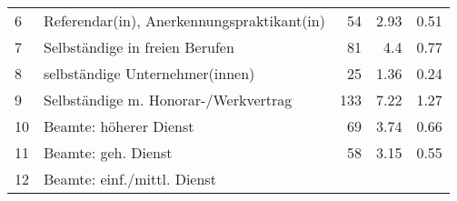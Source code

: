 \begin{longtable}{lXrrr}
     6 &
     \multicolumn{1}{X}{ Referendar(in), Anerkennungspraktikant(in)   } &


       \num{54} &
       \num[round-mode=places,round-precision=2]{2.93} &
         \num[round-mode=places,round-precision=2]{0.51} \\

     7 &
     \multicolumn{1}{X}{ Selbständige in freien Berufen   } &


       \num{81} &
       \num[round-mode=places,round-precision=2]{4.4} &
         \num[round-mode=places,round-precision=2]{0.77} \\

     8 &
     \multicolumn{1}{X}{ selbständige Unternehmer(innen)   } &


       \num{25} &
       \num[round-mode=places,round-precision=2]{1.36} &
         \num[round-mode=places,round-precision=2]{0.24} \\

     9 &
     \multicolumn{1}{X}{ Selbständige m. Honorar-/Werkvertrag   } &


       \num{133} &
       \num[round-mode=places,round-precision=2]{7.22} &
         \num[round-mode=places,round-precision=2]{1.27} \\

     10 &
     \multicolumn{1}{X}{ Beamte: höherer Dienst   } &


       \num{69} &
       \num[round-mode=places,round-precision=2]{3.74} &
         \num[round-mode=places,round-precision=2]{0.66} \\

     11 &
     \multicolumn{1}{X}{ Beamte: geh. Dienst   } &


       \num{58} &
       \num[round-mode=places,round-precision=2]{3.15} &
         \num[round-mode=places,round-precision=2]{0.55} \\

     12 &
     \multicolumn{1}{X}{ Beamte: einf./mittl. Dienst   } &



\end{longtable}
